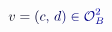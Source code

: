\documentclass[12pt]{article}
\begin{document}
\makeatletter
\renewcommand*{\@textcolor}[3]{%
  \protect\leavevmode
  \begingroup
    \color#1{#2}#3%
  \endgroup
}
\makeatother
\begin{displaymath}
\mathcolor[RGB]{0,0,15}{v} \mathcolor[RGB]{0,0,30}{=} \mathcolor[RGB]{0,0,45}{(} \mathcolor[RGB]{0,0,60}{c} \mathcolor[RGB]{0,0,75}{,} \, \mathcolor[RGB]{0,0,90}{d} \mathcolor[RGB]{0,0,105}{)} \mathcolor[RGB]{0,0,120}{\in} \mathcal { \mathcolor[RGB]{0,0,135}{O} } _ { \mathcolor[RGB]{0,0,150}{B} } ^ { \mathcolor[RGB]{0,0,165}{2} }
\end{displaymath}
\end{document}
